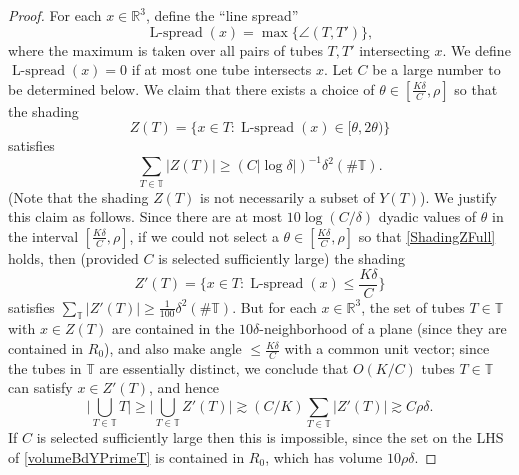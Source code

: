 \documentclass[letterpaper, reqno,11pt]{article}
\numberwithin{equation}{section}
\newcommand{\RR}{\mathbb{R}}
\newcommand{\tubes}{\mathbb{T}}
\numberwithin{thm}{section}
\theoremstyle{remark}
\begin{document}

\begin{proof}
For each $x\in\RR^3$, define the ``line spread'' 
\[
\operatorname{L-spread}(x) = \max\big\{\angle(T,T')\big\},
\]
where the maximum is taken over all pairs of tubes $T,T'$ intersecting $x$. We define $\operatorname{L-spread}(x)=0$ if at most one tube intersects $x$. Let $C$ be a large number to be determined below. We claim that there exists a choice of $\theta\in [\frac{K\delta}{C},\rho]$ so that the shading 
\[
Z(T)=\{x\in T\colon \operatorname{L-spread}(x)\in [\theta,2\theta)\}
\] 
satisfies 
\begin{equation}\label{ShadingZFull}
\sum_{T\in\tubes}|Z(T)|\geq (C|\log\delta|)^{-1} \delta^2(\#\tubes).
\end{equation}
(Note that the shading $Z(T)$ is not necessarily a subset of $Y(T)$). We justify this claim as follows. Since there are at most $10\log(C/\delta)$ dyadic values of $\theta$ in the interval $[\frac{K\delta}{C},\rho]$, if we could not select a $\theta\in [\frac{K\delta}{C},\rho]$ so that \eqref{ShadingZFull} holds, then (provided $C$ is selected sufficiently large) the shading 
\[
Z'(T)=\Big\{x\in T\colon \operatorname{L-spread}(x)\leq \frac{K\delta}{C}\Big\}
\] 
satisfies $\sum_{\tubes}|Z'(T)|\geq \frac{1}{100}\delta^2(\#\tubes)$. But for each $x\in\RR^3$, the set of tubes $T\in\tubes$ with $x\in Z(T)$ are contained in the $10\delta$-neighborhood of a plane (since they are contained in $R_0$), and also make angle $\leq \frac{K\delta}{C}$ with a common unit vector; since the tubes in $\tubes$ are essentially distinct, we conclude that $O(K/C)$ tubes $T\in\tubes$ can satisfy $x\in Z'(T)$, and hence
\begin{equation}\label{volumeBdYPrimeT}
\Big| \bigcup_{T\in\tubes}T\Big| \geq \Big| \bigcup_{T\in\tubes}Z'(T)\Big| \gtrsim (C/K)\sum_{T\in\tubes}|Z'(T)|\gtrsim C \rho\delta.
\end{equation}
If $C$ is selected sufficiently large then this is impossible, since the set on the LHS of \eqref{volumeBdYPrimeT} is contained in $R_0$, which has volume $10\rho\delta$.


\end{proof}
\end{document}
